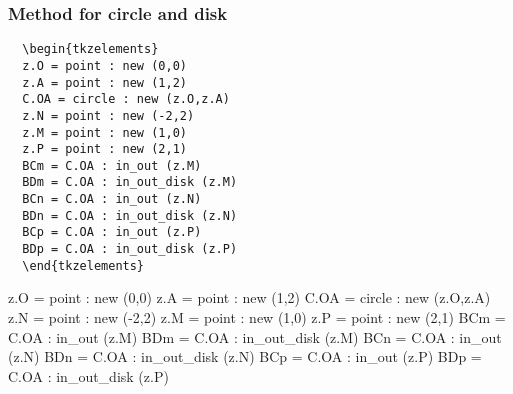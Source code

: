 
\subsubsection{Method  for circle and disk} %
\label{ssub:in_out_for_circle_and_disk}

\begin{minipage}{.5\textwidth}
  \begin{Verbatim}
  \begin{tkzelements}
  z.O = point : new (0,0)
  z.A = point : new (1,2)
  C.OA = circle : new (z.O,z.A)
  z.N = point : new (-2,2)
  z.M = point : new (1,0)
  z.P = point : new (2,1)
  BCm = C.OA : in_out (z.M)
  BDm = C.OA : in_out_disk (z.M)
  BCn = C.OA : in_out (z.N)
  BDn = C.OA : in_out_disk (z.N)
  BCp = C.OA : in_out (z.P)
  BDp = C.OA : in_out_disk (z.P)
  \end{tkzelements}
\end{Verbatim}
\end{minipage}
\begin{minipage}{.5\textwidth}\begin{tkzelements}
z.O = point : new (0,0)
z.A = point : new (1,2)
C.OA = circle : new (z.O,z.A)
z.N = point : new (-2,2)
z.M = point : new (1,0)
z.P = point : new (2,1)
BCm = C.OA : in_out (z.M)
BDm = C.OA : in_out_disk (z.M)
BCn = C.OA : in_out (z.N)
BDn = C.OA : in_out_disk (z.N)
BCp = C.OA : in_out (z.P)
BDp = C.OA : in_out_disk (z.P)
\end{tkzelements}
\def\tkzPosPoint#1#2#3#4{%
\tkzLabelPoints(O,M,N,P)
   \ifthenelse{\equal{\tkzUseLua{#1}}{true}}{
   \tkzLabelPoint[below=#4pt,font=\scriptsize](#2){on  the #3}}{%
   \tkzLabelPoint[below=#4pt,font=\scriptsize](#2){out  the #3}}
}    
\begin{center}
\end{center}
\end{minipage}


